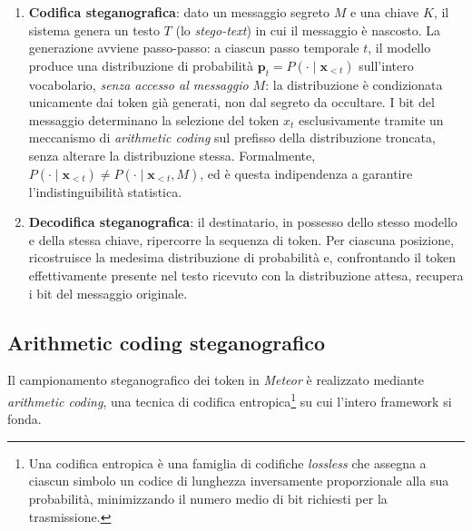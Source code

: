\begin{enumerate}
	\item \textbf{Codifica steganografica}: dato un messaggio segreto $M$ e una chiave $K$, il sistema genera un testo $T$ (lo \emph{stego-text}) in cui il messaggio è nascosto. La generazione avviene passo-passo: a ciascun passo temporale $t$, il modello produce una distribuzione di probabilità $\mathbf{p}_t = P(\cdot \mid \mathbf{x}_{<t})$ sull'intero vocabolario, \emph{senza accesso al messaggio $M$}: la distribuzione è condizionata unicamente dai token già generati, non dal segreto da occultare. I bit del messaggio determinano la selezione del token $x_t$ esclusivamente tramite un meccanismo di \emph{arithmetic coding} sul prefisso della distribuzione troncata, senza alterare la distribuzione stessa. Formalmente, $P(\cdot \mid \mathbf{x}_{<t}) \neq P(\cdot \mid \mathbf{x}_{<t}, M)$, ed è questa indipendenza a garantire l'indistinguibilità statistica.
	\item \textbf{Decodifica steganografica}: il destinatario, in possesso dello stesso modello e della stessa chiave, ripercorre la sequenza di token. Per ciascuna posizione, ricostruisce la medesima distribuzione di probabilità e, confrontando il token effettivamente presente nel testo ricevuto con la distribuzione attesa, recupera i bit del messaggio originale.
\end{enumerate}

\subsection{Arithmetic coding steganografico}
\label{sec:meteor-arithmetic}

Il campionamento steganografico dei token in \emph{Meteor} è realizzato mediante \emph{arithmetic coding}, una tecnica di codifica entropica\footnote{Una codifica entropica è una famiglia di codifiche \emph{lossless} che assegna a ciascun simbolo un codice di lunghezza inversamente proporzionale alla sua probabilità, minimizzando il numero medio di bit richiesti per la trasmissione.} su cui l'intero framework si fonda.

